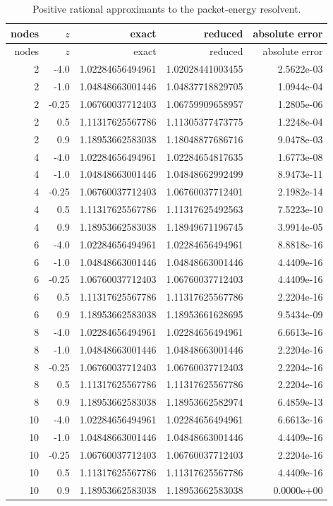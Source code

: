 \begin{longtable}{rrrrr}
\caption{Positive rational approximants to the packet-energy resolvent.}\label{tab:pade}\\
\toprule
nodes & $z$ & exact & reduced & absolute error\\
\midrule
\endfirsthead
\toprule
nodes & $z$ & exact & reduced & absolute error\\
\midrule
\endhead
2 & -4.0 & 1.02284656494961 & 1.02028441003455 & 2.5622e-03 \\
2 & -1.0 & 1.04848663001446 & 1.04837718829705 & 1.0944e-04 \\
2 & -0.25 & 1.06760037712403 & 1.06759909658957 & 1.2805e-06 \\
2 & 0.5 & 1.11317625567786 & 1.11305377473775 & 1.2248e-04 \\
2 & 0.9 & 1.18953662583038 & 1.18048877686716 & 9.0478e-03 \\
4 & -4.0 & 1.02284656494961 & 1.02284654817635 & 1.6773e-08 \\
4 & -1.0 & 1.04848663001446 & 1.04848662992499 & 8.9473e-11 \\
4 & -0.25 & 1.06760037712403 & 1.06760037712401 & 2.1982e-14 \\
4 & 0.5 & 1.11317625567786 & 1.11317625492563 & 7.5223e-10 \\
4 & 0.9 & 1.18953662583038 & 1.18949671196745 & 3.9914e-05 \\
6 & -4.0 & 1.02284656494961 & 1.02284656494961 & 8.8818e-16 \\
6 & -1.0 & 1.04848663001446 & 1.04848663001446 & 4.4409e-16 \\
6 & -0.25 & 1.06760037712403 & 1.06760037712403 & 4.4409e-16 \\
6 & 0.5 & 1.11317625567786 & 1.11317625567786 & 2.2204e-16 \\
6 & 0.9 & 1.18953662583038 & 1.18953661628695 & 9.5434e-09 \\
8 & -4.0 & 1.02284656494961 & 1.02284656494961 & 6.6613e-16 \\
8 & -1.0 & 1.04848663001446 & 1.04848663001446 & 2.2204e-16 \\
8 & -0.25 & 1.06760037712403 & 1.06760037712403 & 2.2204e-16 \\
8 & 0.5 & 1.11317625567786 & 1.11317625567786 & 2.2204e-16 \\
8 & 0.9 & 1.18953662583038 & 1.18953662582974 & 6.4859e-13 \\
10 & -4.0 & 1.02284656494961 & 1.02284656494961 & 6.6613e-16 \\
10 & -1.0 & 1.04848663001446 & 1.04848663001446 & 4.4409e-16 \\
10 & -0.25 & 1.06760037712403 & 1.06760037712403 & 2.2204e-16 \\
10 & 0.5 & 1.11317625567786 & 1.11317625567786 & 4.4409e-16 \\
10 & 0.9 & 1.18953662583038 & 1.18953662583038 & 0.0000e+00 \\
\bottomrule
\end{longtable}
